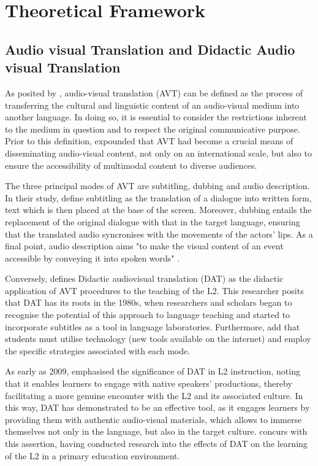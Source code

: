 \section{Theoretical Framework}\label{sec-theoreticalframework}

\subsection{Audio visual Translation and Didactic Audio visual Translation} \label{sub-sec-audiovisualtranslation}

As posited by \textcite{diaz-cintas2012subtitulos}, audio-visual translation (AVT) can be
defined as the process of transferring the cultural and linguistic
content of an audio-visual medium into another language. In doing so, it
is essential to consider the restrictions inherent to the medium in
question and to respect the original communicative purpose. Prior to
this definition, \textcite{diaz-cintas2009new} expounded that AVT had become a
crucial means of disseminating audio-visual content, not only on an
international scale, but also to ensure the accessibility of multimodal
content to diverse audiences.

The three principal modes of AVT are subtitling, dubbing and audio
description. In their study, \textcite{talavan2023didactic} define subtitling as the translation of a dialogue
into written form, text which is then placed at the base of the screen.
Moreover, dubbing entails the replacement of the original dialogue with
that in the target language, ensuring that the translated audio
syncronises with the movements of the actors' lips. As
a final point, audio description aims "to make the visual content of an
event accessible by conveying it into spoken words" \cite[p. 246]{ibanez2016audiodescription}.

Conversely, \textcite{talavan2019traduccion} defines Didactic audiovisual translation
(DAT) as the didactic application of AVT procedures to the teaching of
the L2. This researcher posits that DAT has its roots in the 1980s, when
researchers and scholars began to recognise the potential of this
approach to language teaching and started to incorporate subtitles as a
tool in language laboratories. Furthermore, \textcite{fernandez-costales2023tradilex} add that students must utilise technology (new tools
available on the internet) and employ the specific strategies associated
with each mode.

As early as 2009,  emphasised the significance of DAT in L2
instruction, noting that it enables learners to engage with native
speakers' productions, thereby facilitating a more
genuine encounter with the L2 and its associated culture. In this way,
DAT has demonstrated to be an effective tool, as it engages learners by
providing them with authentic audio-visual materials, which allows to
immerse themselves not only in the language, but also in the target
culture. \textcite{fernandez-costeles2021} concurs with this assertion, having
conducted research into the effects of DAT on the learning of the L2 in
a primary education environment.

